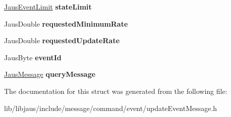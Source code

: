 \begin{DoxyCompactItemize}
\item 
\hypertarget{struct_update_event_message_struct_a3186c3c1757d5fc9b68d542e6997114b}{\hyperlink{struct_jaus_event_limit_struct}{\-Jaus\-Event\-Limit} {\bfseries state\-Limit}}\label{struct_update_event_message_struct_a3186c3c1757d5fc9b68d542e6997114b}

\item 
\hypertarget{struct_update_event_message_struct_a5e7416a58faad022b0c55a0f094ce587}{\-Jaus\-Double {\bfseries requested\-Minimum\-Rate}}\label{struct_update_event_message_struct_a5e7416a58faad022b0c55a0f094ce587}

\item 
\hypertarget{struct_update_event_message_struct_a4f4c11c318c45468791dcc087fd3d339}{\-Jaus\-Double {\bfseries requested\-Update\-Rate}}\label{struct_update_event_message_struct_a4f4c11c318c45468791dcc087fd3d339}

\item 
\hypertarget{struct_update_event_message_struct_a3c53e62abc3a88c5d9511d7c72889c14}{\-Jaus\-Byte {\bfseries event\-Id}}\label{struct_update_event_message_struct_a3c53e62abc3a88c5d9511d7c72889c14}

\item 
\hypertarget{struct_update_event_message_struct_ac49f083c6b28db2cfe93ef3e7e814621}{\hyperlink{struct_jaus_message_struct}{\-Jaus\-Message} {\bfseries query\-Message}}\label{struct_update_event_message_struct_ac49f083c6b28db2cfe93ef3e7e814621}

\end{DoxyCompactItemize}


\-The documentation for this struct was generated from the following file\-:\begin{DoxyCompactItemize}
\item 
lib/libjaus/include/message/command/event/update\-Event\-Message.\-h\end{DoxyCompactItemize}

